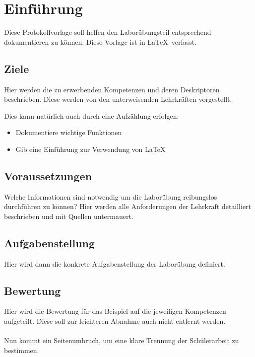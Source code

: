 
\section{Einführung}
Diese Protokollvorlage soll helfen den Laborübungsteil entsprechend dokumentieren zu können. Diese Vorlage ist in \LaTeX ~verfasst.

\subsection{Ziele}
Hier werden die zu erwerbenden Kompetenzen und deren Deskriptoren beschrieben. Diese werden von den unterweisenden Lehrkräften vorgestellt.

Dies kann natürlich auch durch eine Aufzählung erfolgen:
\begin{itemize}
	\item Dokumentiere wichtige Funktionen
	\item Gib eine Einführung zur Verwendung von \LaTeX
\end{itemize}

\subsection{Voraussetzungen}
Welche Informationen sind notwendig um die Laborübung reibungslos durchführen zu können? Hier werden alle Anforderungen der Lehrkraft detailliert beschrieben und mit Quellen untermauert.

\subsection{Aufgabenstellung}
Hier wird dann die konkrete Aufgabenstellung der Laborübung definiert.

\subsection{Bewertung}
Hier wird die Bewertung für das Beispiel auf die jeweiligen Kompetenzen aufgeteilt. Diese soll zur leichteren Abnahme auch nicht entfernt werden.
\\\\
Nun kommt ein Seitenumbruch, um eine klare Trennung der Schülerarbeit zu bestimmen.
\clearpage
